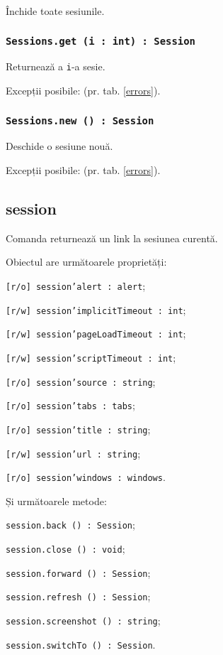 Închide toate sesiunile.

\subsubsection{\texttt{Sessions.get (i : int) : Session}}

Returnează a \texttt{i}-a sesie.

Excepții posibile:  (pr. tab. \ref{errors}).

\subsubsection{\texttt{Sessions.new () : Session}}

Deschide o sesiune nouă.

Excepții posibile:  (pr. tab. \ref{errors}).

\subsection{{\color{orange} session}}

Comanda \session{} returnează un link la sesiunea curentă.

Obiectul \session{} are următoarele proprietăți:
\begin{icItems}
	\item \texttt{[r/o] session'alert : alert};
	\item \texttt{[r/w] session'implicitTimeout : int};
	\item \texttt{[r/w] session'pageLoadTimeout : int};
	\item \texttt{[r/w] session'scriptTimeout : int};
	\item \texttt{[r/o] session'source : string};
	\item \texttt{[r/o] session'tabs : tabs};
	\item \texttt{[r/o] session'title : string};
	\item \texttt{[r/w] session'url : string};
	\item \texttt{[r/o] session'windows : windows}.
\end{icItems}

Și următoarele metode:
\begin{icItems}
	\item \texttt{session.back () : Session};
	\item \texttt{session.close () : void};
	\item \texttt{session.forward () : Session};
	\item \texttt{session.refresh () : Session};
	\item \texttt{session.screenshot () : string};
	\item \texttt{session.switchTo () : Session}.
\end{icItems}


